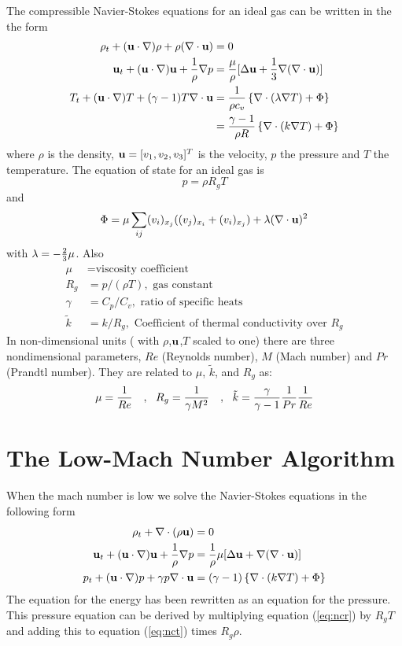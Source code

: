 \documentclass{article}
\begin{document}
The compressible Navier-Stokes equations for an ideal gas can be
written in the the form
\begin{align}
   \rho_t + ({\bf u}\cdot\nabla)\rho + \rho( \nabla\cdot{\bf u}) &= 0           \label{eq:ncr} \\
   {\bf u}_t +({\bf u}\cdot\nabla){\bf u} + {1\over \rho} \nabla p
  &= {\mu\over \rho}[\Delta {\bf u} + {1\over 3}\nabla(\nabla\cdot{\bf u})]  \label{eq:ncu}\\
   T_t + ({\bf u}\cdot\nabla) T +(\gamma-1) T \nabla\cdot{\bf u}
       & = {1\over\rho c_v} \left\{ \nabla\cdot( \lambda \nabla T) + \Phi \right\}  \\
       & = {\gamma-1\over \rho R}  \left\{ \nabla\cdot( k \nabla T) + \Phi \right\}   \label{eq:nct}
\end{align}
where $\rho$ is the density, ${\bf u}=[v_1,v_2,v_3]^T$ is the velocity,
 $p$ the pressure
and $T$ the temperature.
The equation of state for an ideal gas is
$$
     p = \rho R_g T
$$
and
$$
\Phi = \mu
\sum_{ij} (v_i)_{x_j} ((v_j)_{x_i} + (v_i)_{x_j} )
+ \lambda (\nabla\cdot{\bf u})^2
$$
with $\lambda=-{2\over3} \mu$.
Also
$$
\begin{array}{rl}
 \mu  &= \mbox{viscosity coefficient} \\
 R_g  & = p/(\rho T), \mbox{ gas constant} \\
   \gamma & = C_p/C_v, \mbox{ ratio of specific heats} \\
\tilde{k}&=k/R_g,\mbox{ Coefficient of thermal conductivity over } R_g
\end{array}
$$
In non-dimensional units ( with $\rho$,${\bf u}$,$T$ scaled to one) there are
three nondimensional parameters, $Re$ (Reynolds number),
$M$ (Mach number)
and $Pr$ (Prandtl number). They are related to $\mu$,
$\tilde{k}$, and $R_g$ as:
$$
           \mu    = {1\over Re}   ~~~,~~
            R_g   = {1 \over \gamma M^2}   ~~~,~~
      \tilde{k}   = {\gamma \over \gamma-1} {1\over Pr} {1\over Re}
$$



\section{The Low-Mach Number Algorithm}


When the mach number is low we solve the Navier-Stokes equations in the following form
\begin{align*}
   \rho_t + \nabla\cdot(\rho {\bf u}) &= 0 \\
   {\bf u}_t + ({\bf u}\cdot\nabla){\bf u} + {1\over\rho}\nabla p &= {1\over\rho} \mu [\Delta {\bf u} + \nabla(\nabla\cdot{\bf u}) ] \\
   p_t + ({\bf u}\cdot\nabla) p + \gamma p \nabla\cdot{\bf u} &= 
           (\gamma-1)\left\{  \nabla\cdot( k \nabla T) + \Phi \right\} 
\end{align*}
The equation for the energy has been rewritten as an equation for the pressure. This pressure equation can be 
derived by multiplying equation (\ref{eq:ncr}) by $R_gT$ and adding this to equation (\ref{eq:nct}) times
$R_g\rho$.
\end{document}
